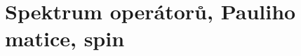 \section[Spin]{Spektrum operátorů, Pauliho matice, spin}
\begin{theory}
    
    
    
\end{theory}







